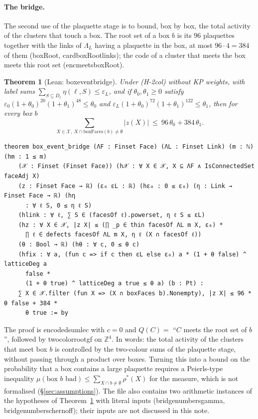 \documentclass[11pt,a4paper]{article}
\newtheorem{theorem}{Theorem}[section]
\theoremstyle{definition}
\theoremstyle{remark}
\DeclareRobustCommand{\lean}[1]{{\ttfamily\renewcommand{\_}{\textunderscore\allowbreak}#1}}
\newenvironment{leanquote}{\par\smallskip\footnotesize}{\par\smallskip}
\newcommand{\Z}{\mathbb{Z}}
\begin{document}
\paragraph{The bridge.} The second use of the plaquette stage is to bound, box by box, the total activity of the clusters that touch a box. The root set of a box $b$ is its $96$ plaquettes together with the links of $\Lambda_L$ having a plaquette in the box, at most $96\cdot4=384$ of them (\lean{boxRoot}, \lean{card\_boxRoot\_links}); the code of a cluster that meets the box meets this root set (\lean{enc\_meets\_boxRoot}).

\begin{theorem}[Lean: \lean{box\_event\_bridge}]\label{thm:bridge}
Under (H-2col) without KP weights, with label sums $\sum_{S\subseteq D_\ell}\eta(\ell,S)\le\varepsilon_L$, and if $\theta_0,\theta_1\ge0$ satisfy $\varepsilon_0(1+\theta_0)^{20}(1+\theta_1)^{48}\le\theta_0$ and $\varepsilon_L(1+\theta_0)^{72}(1+\theta_1)^{122}\le\theta_1$, then for every box $b$
\[
\sum_{X\in\mathcal X,\ X\cap\mathrm{boxFaces}(b)\ne\emptyset}|z(X)|\ \le\ 96\,\theta_0+384\,\theta_1 .
\]
\end{theorem}
\begin{leanquote}
\begin{verbatim}
theorem box_event_bridge (ΛF : Finset Face) (ΛL : Finset Link) (m : ℕ) (hm : 1 ≤ m)
    (𝒳 : Finset (Finset Face)) (h𝒳 : ∀ X ∈ 𝒳, X ⊆ ΛF ∧ IsConnectedSet faceAdj X)
    (z : Finset Face → ℝ) (ε₀ εL : ℝ) (hε₀ : 0 ≤ ε₀) (η : Link → Finset Face → ℝ) (hη
      : ∀ ℓ S, 0 ≤ η ℓ S)
    (hlink : ∀ ℓ, ∑ S ∈ (facesOf ℓ).powerset, η ℓ S ≤ εL)
    (hz : ∀ X ∈ 𝒳, |z X| ≤ (∏ _p ∈ thin facesOf ΛL m X, ε₀) *
      ∏ ℓ ∈ defects facesOf ΛL m X, η ℓ (X ∩ facesOf ℓ))
    (θ : Bool → ℝ) (hθ : ∀ c, 0 ≤ θ c)
    (hfix : ∀ a, (fun c => if c then εL else ε₀) a * (1 + θ false) ^ latticeDeg a
      false *
      (1 + θ true) ^ latticeDeg a true ≤ θ a) (b : Pt) :
    ∑ X ∈ 𝒳.filter (fun X => (X ∩ boxFaces b).Nonempty), |z X| ≤ 96 * θ false + 384 *
      θ true := by
\end{verbatim}
\end{leanquote}
The proof is \lean{encoded\_sum\_le\_c} with $c=0$ and $Q(C)=$ ``$C$ meets the root set of $b$'', followed by \lean{two\_color\_root\_gf} on $\Z^4$. In words: the total activity of the clusters that meet box $b$ is controlled by the two-colour sums of the plaquette stage, without passing through a product over boxes. Turning this into a bound on the probability that a box contains a large plaquette requires a Peierls-type inequality $\mu(\text{box $b$ bad})\le\sum_{X\cap b\ne\emptyset}\rho^*(X)$ for the measure, which is not formalised (\S\ref{sec:assumptions}). The file also contains two arithmetic instances of the hypotheses of Theorem~\ref{thm:bridge} with literal inputs (\lean{bridge\_numbers\_gamma}, \lean{bridge\_numbers\_chernoff}); their inputs are not discussed in this note.
\end{document}
